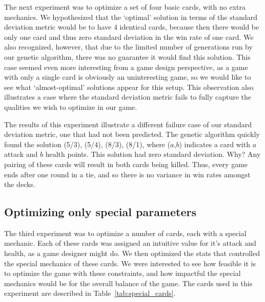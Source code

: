 The next experiment was to optimize a set of four basic cards, with no extra mechanics. We hypothesized that the `optimal' solution in terms of the standard deviation metric would be to have 4 identical cards, because then there would be only one card and thus zero standard deviation in the win rate of one card. We also recognized, however, that due to the limited number of generations run by our genetic algorithm, there was no guarantee it would find this solution. This case seemed even more interesting from a game design perspective, as a game with only a single card is obviously an uninteresting game, so we would like to see what `almost-optimal' solutions appear for this setup. This observation also illustrates a case where the standard deviation metric fails to fully capture the qualities we wish to optimize in our game.

The results of this experiment illustrate a different failure case of our standard deviation metric, one that had not been predicted. The genetic algorithm quickly found the solution (5/3), (5/4), (8/3), (8/1), where ($a$,$b$) indicates a card with $a$ attack and $b$ health points. This solution had zero standard deviation. Why? Any pairing of these cards will result in both cards being killed. Thus, every game ends after one round in a tie, and so there is no variance in win rates amongst the decks. 

 \subsection{Optimizing only special parameters}

The third experiment was to optimize a number of cards, each with a special mechanic. Each of these cards was assigned an intuitive value for it's attack and health, as a game designer might do. We then optimized the stats that controlled the special mechanics of these cards. We were interested to see how feasible it is to optimize the game with these constraints, and how impactful the special mechanics would be for the overall balance of the game. The cards used in this experiment are described in Table~\ref{tab:special_cards}.

